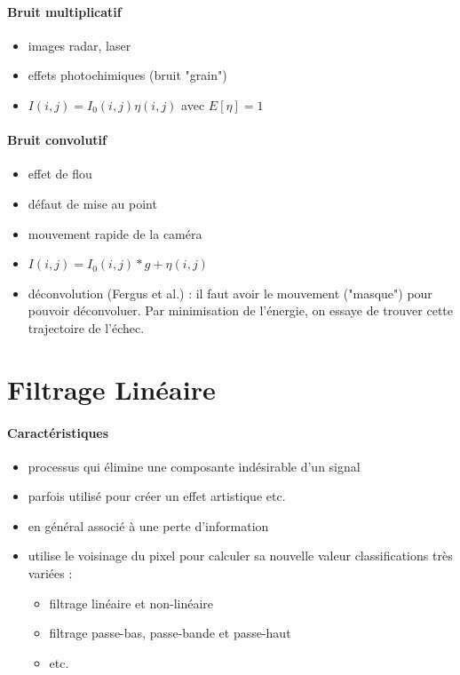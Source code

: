 \documentclass[main.tex]{subfiles}
\begin{document}
\paragraph{Bruit multiplicatif}
\begin{itemize}
\item images radar, laser
\item effets photochimiques (bruit "grain")
\item $I(i,j)=I_0(i,j)\eta(i,j)$ avec $E[\eta]=1$
\end{itemize}

\paragraph{Bruit convolutif}
\begin{itemize}
\item effet de flou
\item défaut de mise au point
\item mouvement rapide de la caméra
\item $I(i,j)=I_0(i,j)*g+\eta(i,j)$
\item déconvolution (Fergus et al.) : il faut avoir le mouvement ("masque") pour pouvoir déconvoluer. Par minimisation de l'énergie, on essaye de trouver cette trajectoire de l'échec.
\end{itemize}

\section{Filtrage Linéaire}
\paragraph{Caractéristiques}
\begin{itemize}
\item processus qui élimine une composante indésirable d’un signal
\item parfois utilisé pour créer un effet artistique etc.
\item en général associé à une perte d’information
\item utilise le voisinage du pixel pour calculer sa nouvelle valeur
classifications très variées :
\begin{itemize}
\item filtrage linéaire et non-linéaire
\item filtrage passe-bas, passe-bande et passe-haut
\item etc.
\end{itemize}
\end{itemize}
\end{document}
